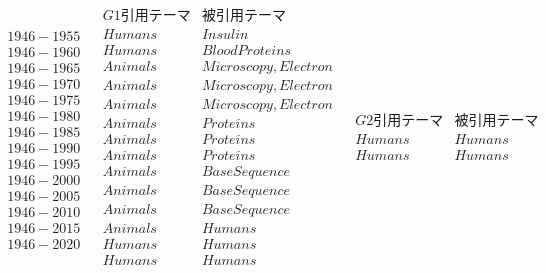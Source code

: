 \begin{table}[h]
\begin{center}
\caption{累積世代ごと論文グループごとの最頻出テーマ} \label{tab:topmesh}
{\tiny
\[\begin{array}{c|cccc}
\begin{array}{c}
 { } \\
\hline
 {1946-1955} \\
 {1946-1960} \\
 {1946-1965} \\
 {1946-1970} \\
 {1946-1975} \\
 {1946-1980} \\
 {1946-1985} \\
 {1946-1990} \\
 {1946-1995} \\
 {1946-2000} \\
 {1946-2005} \\
 {1946-2010} \\
 {1946-2015} \\
 {1946-2020} \\
\end{array}
 & 
\begin{array}{cc}
 {G1引用テーマ} & {被引用テーマ} \\
\hline
 {Humans} & {Insulin} \\
 {Humans} & {Blood Proteins} \\
 {Animals} & {Microscopy, Electron} \\
 {Animals} & {Microscopy, Electron} \\
 {Animals} & {Microscopy, Electron} \\
 {Animals} & {Proteins} \\
 {Animals} & {Proteins} \\
 {Animals} & {Proteins} \\
 {Animals} & {Base Sequence} \\
 {Animals} & {Base Sequence} \\
 {Animals} & {Base Sequence} \\
 {Animals} & {Humans} \\
 {Humans} & {Humans} \\
 {Humans} & {Humans} \\
\end{array}
 & 
\begin{array}{cc}
 {G2引用テーマ} & {被引用テーマ} \\
\hline
 {Humans} & {Humans} \\
 {Humans} & {Humans} \\

\end{array}
\end{array}\]}
\end{center}
\end{table}
